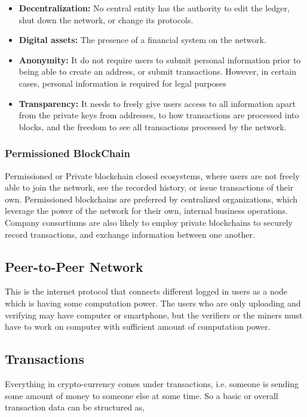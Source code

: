 \begin{itemize}
\item \textbf{Decentralization:} No central entity has the authority to edit the ledger, shut down the network, or change its protocols.
\item \textbf{Digital assets:} The presence of a financial system on the network.
\item \textbf{Anonymity:} It do not require users to submit personal information prior to being able to create an address, or submit transactions. However, in certain cases, personal information is required for legal purposes
\item \textbf{Transparency:} It needs to freely give users access to all information apart from the private keys from addresses, to how transactions are processed into blocks, and the freedom to see all transactions processed by the network.
\end{itemize}

\subsubsection{Permissioned BlockChain}
Permissioned or Private blockchain closed ecosystems, where users are not freely able to join the network, see the recorded history, or issue transactions of their own. Permissioned blockchains are preferred by centralized organizations, which leverage the power of the network for their own, internal business operations. Company consortiums are also likely to employ private blockchains to securely record transactions, and exchange information between one another.

\subsection{Peer-to-Peer Network}
This is the internet protocol that connects different logged in users as a node which is having some computation power. The users who are only uploading and verifying may have computer or smartphone, but the verifiers or the miners must have to work on computer with sufficient amount of computation power.



\subsection{Transactions}
Everything in crypto-currency comes under transactions, i.e. someone is sending some amount of money to someone else at some time. So a basic or overall transaction data can be structured as,

